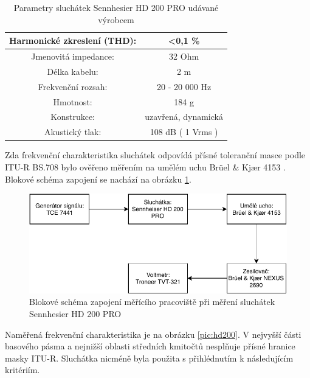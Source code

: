 \begin{table}[h]
    \centering
    \begin{tabular}{|c|c|}
    \hline
    Harmonické zkreslení (THD): & \textless{}0,1 \% \\ \hline
    Jmenovitá impedance: & 32 Ohm \\ \hline
    Délka kabelu: & 2 m \\ \hline
    Frekvenční rozsah: & 20 - 20 000 Hz \\ \hline
    Hmotnost: & 184 g \\ \hline
    Konstrukce: & uzavřená, dynamická \\ \hline
    Akustický tlak: & 108 dB ( 1 Vrms ) \\ \hline
    \end{tabular}
    \caption{Parametry  sluchátek Sennhesier HD 200 PRO udávané výrobcem \cite{web:senn}}
    \label{table:hd200}
\end{table}

Zda frekvenční charakteristika sluchátek odpovídá přísné toleranční masce podle ITU-R BS.708 \cite{itur:708} bylo ověřeno měřením na umělém uchu Brüel \& Kjær 4153 \cite{web:earsim}. Blokové schéma zapojení se nachází na obrázku \ref{pic:measure}.

\begin{figure}[h]
    \centering
    \includegraphics[width = .8\textwidth]{pic/measure.pdf}
    \caption{Blokové schéma zapojení měřícího pracoviště při měření sluchátek Sennhesier HD 200 PRO}
    \label{pic:measure}
\end{figure}

 Naměřená frekvenční charakteristika je na obrázku \ref{pic:hd200}. V nejvyšší části basového pásma a nejnižší oblasti středních kmitočtů nesplňuje přísné hranice masky ITU-R. Sluchátka nicméně byla použita s přihlédnutím k následujícím kritériím.
 
